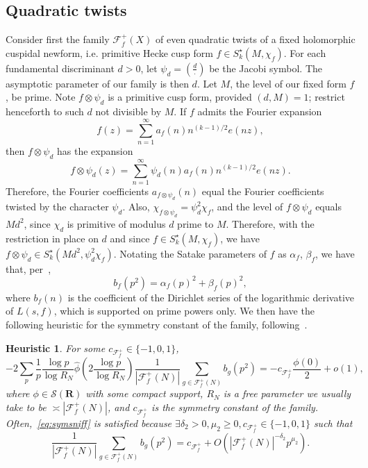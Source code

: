 \documentclass[11pt,reqno]{amsart} \usepackage{fullpage}
\newtheorem{heuristic}{Heuristic}
\renewcommand{\geq}{\geqslant}
\newcommand{\R}{\ensuremath{\mathbf{R}}}
\newcommand{\F}{\ensuremath{\mathbf{F}}}
\newcommand\be{\begin{equation}}
\newcommand\ee{\end{equation}}
\renewcommand{\F}{\mathcal F_f}
\numberwithin{equation}{section}
\begin{document}
\subsection{Quadratic twists}
Consider first the family $\F^+(X)$ of even quadratic twists of a fixed holomorphic
cuspidal newform, i.e. primitive Hecke cusp form $f\in S^\star_k(M,\chi_f)$. For each
fundamental discriminant $d>0$, let $\psi_d=\left(\frac d\cdot\right)$ be the Jacobi
symbol. The
asymptotic parameter of our family is then $d$. Let $M$, the level of our fixed form $f$,
be prime. Note $f\otimes\psi_d$ is a primitive cusp form, provided $(d,M)=1$; restrict
henceforth to such $d$ not divisible by $M$. If $f$ admits the Fourier expansion
\be f(z)=\sum_{n=1}^\infty a_f(n)n^{(k-1)/2}e(nz),\ee then $f\otimes\psi_d$ has the
expansion \be f\otimes\psi_d(z)=\sum_{n=1}^\infty\psi_d(n)a_f(n)n^{(k-1)/2}e(nz).\ee
Therefore, the Fourier coefficients $a_{f\otimes\psi_d}(n)$ equal the Fourier coefficients
twisted by the character $\psi_d$. Also, $\chi_{f\otimes\psi_d}=\psi_d^2\chi_f$, and the
level of $f\otimes\psi_d$ equals $Md^2$, since $\chi_d$ is primitive of modulus $d$ prime
to $M$.
Therefore, with the restriction in place on $d$ and since $f\in S^\star_k(M,\chi_f)$, we
have $f\otimes\psi_d\in S^\star_k\left(Md^2,\psi_d^2\chi_f\right)$. Notating the Satake
parameters of $f$ as $\alpha_f$, $\beta_f$, we have that, per~\cite[Definition 2.1]{conv},
\be b_f\left(p^2\right)=\alpha_f(p)^2+\beta_f(p)^2,\ee where $b_f(n)$ is the coefficient of
the Dirichlet series of the logarithmic derivative of $L(s,f)$, which is supported on prime
powers only. We then have the following heuristic for the symmetry constant of the family,
following~\cite[Definition 1.1(3ii)]{conv}.
\begin{heuristic}\label{heur}
  For some $c_{\F^+}\in\{-1,0,1\}$, \be\label{eq:symsniff}
  -2\sum_p\frac1p\frac{\log p}{\log R_N}
  \hat\phi\left(2\frac{\log p}{\log R_N}\right)\frac1{\left|\F^+(N)\right|}
  \sum_{g\in\F^+(N)}b_g\left(p^2\right)=-c_{\F^+}\frac{\phi(0)}2+o(1),\ee
  where $\phi\in\mathcal S(\R)$ with some compact support, $R_N$ is a free parameter
  we usually take to be $\asymp\left|\F^+(N)\right|$, and $c_{\F^+}$ is
  the symmetry constant of the family.
  Often,~\eqref{eq:symsniff} is satisfied because $\exists\delta_2>0,\mu_2\geq0,
  c_{\F^+}\in\{-1,0,1\}$ such that \be\label{eq:shortsniff}
  \frac1{\left|\F^+(N)\right|}
  \sum_{g\in\F^+(N)}b_g\left(p^2\right)=c_{\F^+}
  +O\left(\left|\F^+(N)\right|^{-\delta_2}p^{\mu_2}\right).\ee
\end{heuristic}
\end{document}
